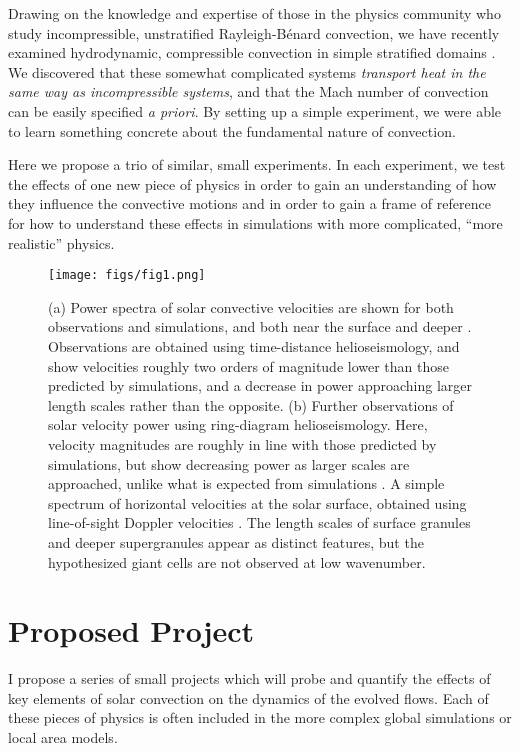 \documentclass[aps, pre, onecolumn, nofootinbib, notitlepage, groupedaddress, amsfonts, amssymb, amsmath, longbibliography]{revtex4-1}
\newcommand{\RB}{Rayleigh-B\'{e}nard }
\begin{document}
Drawing on the knowledge and expertise of those in the physics community who study incompressible,
unstratified \RB convection, we have recently examined hydrodynamic, compressible convection
in simple stratified domains \cite{anders&brown2017}.  We discovered that these somewhat complicated systems
\emph{transport heat in the same way as incompressible systems}, and that the Mach number of
convection can be easily specified \emph{a priori}.  By setting up a simple experiment, we
were able to learn something concrete about the fundamental nature of convection.  

Here we propose a trio of similar, small experiments.  In each experiment, we test the effects
of one new piece of physics in order to gain an understanding of how they influence the convective
motions and in order to gain a frame of reference for how to understand these effects in 
simulations with more complicated, ``more realistic'' physics.


\begin{figure}[t]
\centering
\texttt{[image: figs/fig1.png]}
\caption{(a) Power spectra of solar convective velocities are shown for both observations and simulations,
and both near the surface and deeper \cite{hanasoge&all2012}.  Observations are obtained
using time-distance helioseismology, and show velocities roughly two orders of magnitude lower
than those predicted by simulations, and a decrease in power approaching larger length
scales rather than the opposite. (b) Further observations of solar velocity power  using
ring-diagram helioseismology.  Here, velocity magnitudes are roughly in line with those
predicted by simulations, but show decreasing power as larger scales are approached, unlike
what is expected from simulations \cite{greer&all2015}.  A simple spectrum of horizontal
velocities at the solar surface, obtained using line-of-sight Doppler velocities \cite{hathaway&all2015}.
The length scales of surface granules and deeper supergranules appear as distinct features, but
the hypothesized giant cells are not observed at low wavenumber.
        \label{fig:fig1}}
\end{figure}

\section{Proposed Project}
I propose a series of small projects which will probe and quantify the effects of key
elements of solar convection on the dynamics of the evolved flows.  Each of these pieces
of physics is often included in the more complex global simulations or local area models.
\end{document}
